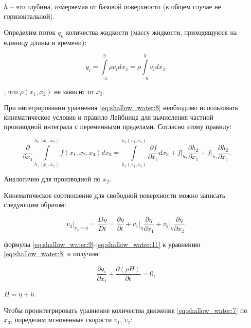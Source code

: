 \documentclass[14pt]{extreport}
\begin{document}
 $h$ -- это глубина, измеряемая от базовой поверхности (в общем случае не горизонтальной).

Определим поток $q_k$ количества жидкости (массу жидкости, приходящуюся на единицу длины и времени):

\begin{equation}\label{eq:shallow_water:9}
q_i = \int\limits^\eta_{-h} \rho v_i dx_3 = \rho \int\limits^\eta_{-h} v_i dx_3.
\end{equation}

, что $\rho(x_1, x_2)$ не зависит от $x_3$.

При интегрировании уравнения \ref{eq:shallow_water:8} необходимо использовать кинематическое условие и правило Лейбница \cite{bib:calc:zorich} для вычисления частной производной интеграла с переменными пределами. Согласно этому правилу:


\begin{equation}\label{eq:shallow_water:10}
\frac{\partial}{\partial x_1} \int\limits^{h_2(x_1,x_2)}_{h_1(x_1,x_2)} f(x_1, x_2, x_3) dx_3=\int\limits^{h_2(x_1,x_2)}_{h_1(x_1,x_2)} \frac{\partial f}{\partial x_1} dx_3 + f \bigg|_{h_2}  \frac{\partial h_2}{\partial x_1} + f \bigg|_{h_1} \frac{\partial h_2}{\partial x_1}.
\end{equation}

Аналогично для производной по $x_2$.

Кинематическое соотношение для свободной поверхности можно записать следующим образом:

\begin{equation}\label{eq:shallow_water:11}
v_3\bigg|_{x_2=\eta} = \frac{D\eta}{Dt} = \frac{\partial \eta}{\partial t} + v_1 \bigg|_{\eta} \frac{\partial \eta}{\partial x_1} + v_2 \bigg|_{\eta}\frac{\partial \eta}{\partial x_2}.
\end{equation}

 формулы \ref{eq:shallow_water:9}-\ref{eq:shallow_water:11} к уравнению \ref{eq:shallow_water:8} и получим:

\begin{equation}\label{eq:shallow_water:12}
\frac{ \partial q_i}{\partial x_i} + \frac{\partial(\rho H)}{\partial t} = 0,
\end{equation}

 $H=\eta+h$.

Чтобы проинтегрировать уравнение количества движения \ref{eq:shallow_water:7} по $x_3$, определим мгновенные скорости $v_1$, $v_2$:
\end{document}
